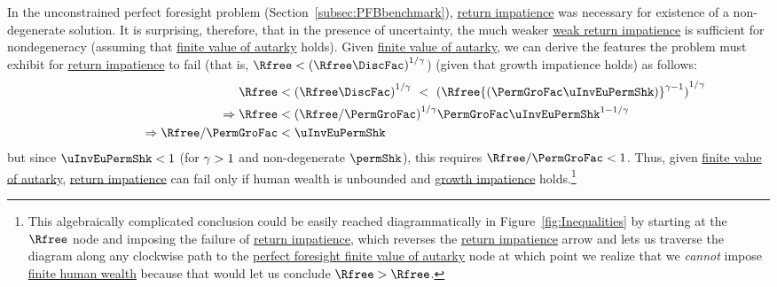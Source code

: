 \documentclass[BufferStockTheory]{subfiles}
\begin{document}
In the unconstrained perfect foresight problem (Section~\ref{subsec:PFBbenchmark}), \hyperlink{RIC}{return impatience} was necessary for existence of a non-degenerate solution.
It is surprising, therefore, that in the presence of uncertainty, the much weaker \hyperlink{WRIC}{weak return impatience} is sufficient for nondegeneracy (assuming that \hyperlink{FVAC}{finite value of autarky}  holds).
Given \hyperlink{FVAC}{finite value of autarky}, we can derive the features the problem must exhibit for \hyperlink{RIC}{return impatience} to fail (that is, $\Rfree < {(\Rfree \DiscFac)}^{1/\CRRA}$) (given that growth impatience holds) as follows:
%
\begin{equation}\label{eq:RICimplies}
  \begin{aligned}
    \Rfree   & < {(\Rfree \DiscFac)}^{1/\CRRA} ~ < ~ {(\Rfree {(\PermGroFac \uInvEuPermShk)}^{\CRRA-1})}^{1/\CRRA}
    \\ \Rightarrow \Rfree   & < {(\Rfree/\PermGroFac)}^{1/\CRRA}\PermGroFac \uInvEuPermShk^{1-1/\CRRA}
    \\  \qquad\qquad\qquad \Rightarrow  \Rfree/\PermGroFac  & < \uInvEuPermShk
  \end{aligned}
\end{equation}
%
but since $\uInvEuPermShk < 1$ (for $\gamma>1$ and non-degenerate $\permShk$), this requires $\Rfree/\PermGroFac < 1$.
Thus, given \hyperlink{FVAC}{finite value of autarky}, \hyperlink{RIC}{return impatience} can fail only if human wealth is unbounded and \hyperlink{GIC}{growth impatience} holds.\footnote{This algebraically complicated conclusion could be easily reached diagrammatically in Figure~\ref{fig:Inequalities} by starting at the $\Rfree$ node and imposing the failure of \hyperlink{RIC}{return impatience}, which reverses the \hyperlink{RIC}{return impatience} arrow and lets us traverse the diagram along any clockwise path to the \hyperlink{PFFVAC}{perfect foresight finite value of autarky} node at which point we realize that we \textit{cannot} impose \hyperlink{FHWC}{finite human wealth} because that would let us conclude $\Rfree > \Rfree$.}
\end{document}
